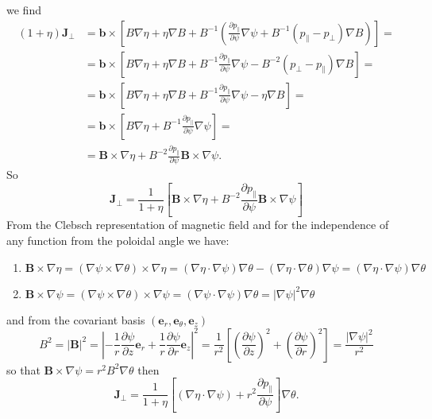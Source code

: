 we find
\begin{equation*}
  \begin{split}
    (1+\eta)\mathbf{J}_\perp&=\mathbf{b}\times\left[B\nabla\eta+\eta\nabla B+B^{-1}\left(\frac{\partial p_\parallel}{\partial \psi}\nabla\psi+B^{-1}(p_\parallel-p_\perp)\nabla B\right)\right]=\\
    &=\mathbf{b}\times\left[B\nabla\eta+\eta\nabla B+B^{-1}\frac{\partial p_\parallel}{\partial \psi}\nabla\psi-B^{-2}(p_\perp-p_\parallel)\nabla B\right]=\\
    &=\mathbf{b}\times\left[B\nabla\eta+\eta\nabla B+B^{-1}\frac{\partial p_\parallel}{\partial \psi}\nabla\psi-\eta\nabla B\right]=\\
    &=\mathbf{b}\times\left[B\nabla\eta+B^{-1}\frac{\partial p_\parallel}{\partial \psi}\nabla\psi\right]=\\
    &=\mathbf{B}\times\nabla\eta+B^{-2}\frac{\partial p_\parallel}{\partial \psi}\mathbf{B}\times\nabla\psi.
  \end{split}
\end{equation*}
So
\begin{equation*}
  \mathbf{J}_\perp=\frac{1}{1+\eta}\left[\mathbf{B}\times\nabla\eta+B^{-2}\frac{\partial p_\parallel}{\partial \psi}\mathbf{B}\times\nabla\psi\right]
\end{equation*}
From the Clebsch representation of magnetic field and for the independence of any function from the poloidal angle we have:
\begin{enumerate}
 \item $\mathbf{B}\times\nabla\eta=(\nabla\psi\times\nabla\theta)\times\nabla\eta=(\nabla\eta\cdot\nabla\psi)\nabla\theta-(\nabla\eta\cdot\nabla\theta)\nabla\psi=(\nabla\eta\cdot\nabla\psi)\nabla\theta$
  \item $\mathbf{B}\times\nabla\psi=(\nabla\psi\times\nabla\theta)\times\nabla\psi=(\nabla\psi\cdot\nabla\psi)\nabla\theta=|\nabla\psi|^2\nabla\theta$
\end{enumerate}
and from the covariant basis $(\mathbf{e}_r,\mathbf{e}_\theta,\mathbf{e}_z)$
\begin{equation*}
  B^2=|\mathbf{B}|^2=|-\frac{1}{r}\frac{\partial\psi}{\partial z}\mathbf{e}_r+\frac{1}{r}\frac{\partial\psi}{\partial r}\mathbf{e}_z|^2=\frac{1}{r^2}[(\frac{\partial\psi}{\partial z})^2+(\frac{\partial\psi}{\partial r})^2]=\frac{|\nabla\psi|^2}{r^2}
\end{equation*}
so that $\mathbf{B}\times\nabla\psi=r^2 B^2\nabla\theta$ then
\begin{equation*}
  \mathbf{J}_\perp=\frac{1}{1+\eta}\left[(\nabla\eta\cdot\nabla\psi)+r^2\frac{\partial p_\parallel}{\partial \psi}\right]\nabla\theta.
\end{equation*}

